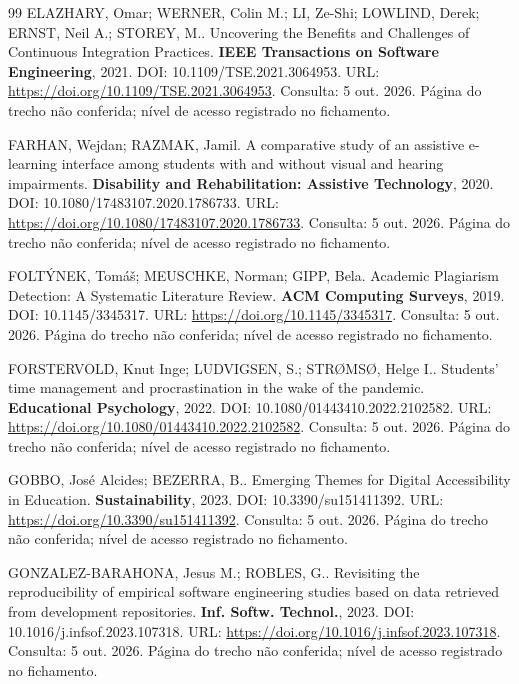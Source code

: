 \begin{thebibliography}{99}
 ELAZHARY, Omar; WERNER, Colin M.; LI, Ze-Shi; LOWLIND, Derek; ERNST, Neil A.; STOREY, M.. Uncovering the Benefits and Challenges of Continuous Integration Practices. \textbf{IEEE Transactions on Software Engineering}, 2021. DOI: 10.1109/TSE.2021.3064953. URL: \url{https://doi.org/10.1109/TSE.2021.3064953}. Consulta: 5 out. 2026. Página do trecho não conferida; nível de acesso registrado no fichamento.


 FARHAN, Wejdan; RAZMAK, Jamil. A comparative study of an assistive e-learning interface among students with and without visual and hearing impairments. \textbf{Disability and Rehabilitation: Assistive Technology}, 2020. DOI: 10.1080/17483107.2020.1786733. URL: \url{https://doi.org/10.1080/17483107.2020.1786733}. Consulta: 5 out. 2026. Página do trecho não conferida; nível de acesso registrado no fichamento.


 FOLTÝNEK, Tomáš; MEUSCHKE, Norman; GIPP, Bela. Academic Plagiarism Detection: A Systematic Literature Review. \textbf{ACM Computing Surveys}, 2019. DOI: 10.1145/3345317. URL: \url{https://doi.org/10.1145/3345317}. Consulta: 5 out. 2026. Página do trecho não conferida; nível de acesso registrado no fichamento.


 FORSTERVOLD, Knut Inge; LUDVIGSEN, S.; STRØMSØ, Helge I.. Students’ time management and procrastination in the wake of the pandemic. \textbf{Educational Psychology}, 2022. DOI: 10.1080/01443410.2022.2102582. URL: \url{https://doi.org/10.1080/01443410.2022.2102582}. Consulta: 5 out. 2026. Página do trecho não conferida; nível de acesso registrado no fichamento.


 GOBBO, José Alcides; BEZERRA, B.. Emerging Themes for Digital Accessibility in Education. \textbf{Sustainability}, 2023. DOI: 10.3390/su151411392. URL: \url{https://doi.org/10.3390/su151411392}. Consulta: 5 out. 2026. Página do trecho não conferida; nível de acesso registrado no fichamento.


 GONZALEZ-BARAHONA, Jesus M.; ROBLES, G.. Revisiting the reproducibility of empirical software engineering studies based on data retrieved from development repositories. \textbf{Inf. Softw. Technol.}, 2023. DOI: 10.1016/j.infsof.2023.107318. URL: \url{https://doi.org/10.1016/j.infsof.2023.107318}. Consulta: 5 out. 2026. Página do trecho não conferida; nível de acesso registrado no fichamento.



\end{thebibliography}
